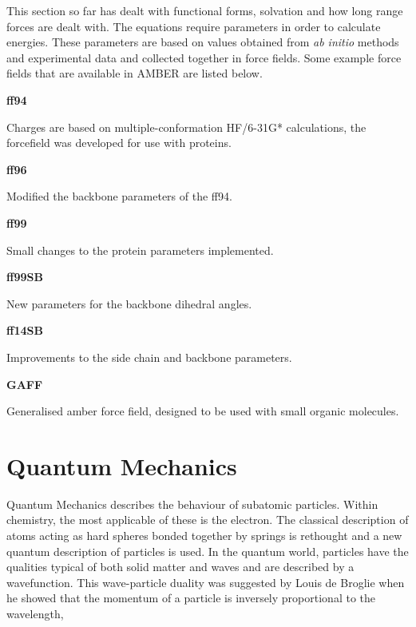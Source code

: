 This section so far has dealt with functional forms, solvation and how long range forces are dealt with.  The equations require parameters in order to calculate energies.  These parameters are based on values obtained from \textit{ab initio} methods and experimental data and collected together in force fields.  Some example force fields that are available in AMBER\cite{amber_ref} are listed below.

\noindent
\textbf{ff94}\cite{ff94}

Charges are based on multiple-conformation HF/6-31G* calculations, the forcefield was developed for use with proteins.

\noindent
\textbf{ff96}\cite{ff96}

Modified the backbone parameters of the ff94.

\noindent
\textbf{ff99}\cite{ff99}

Small changes to the protein parameters implemented.

\noindent
\textbf{ff99SB}\cite{amber_ff_review}

New parameters for the backbone dihedral angles.

\noindent
\textbf{ff14SB}\cite{amber14}

Improvements to the side chain and backbone parameters.

\noindent
\textbf{GAFF}\cite{gaff}

Generalised amber force field, designed to be used with small organic molecules.

\clearpage

\section{Quantum Mechanics}

Quantum Mechanics describes the behaviour of subatomic particles.  Within chemistry, the most applicable of these is the electron.  The classical description of atoms acting as hard spheres bonded together by springs is rethought and a new quantum description of particles is used.  In the quantum world, particles have the qualities typical of both solid matter and waves and are described by a wavefunction.  This wave-particle duality was suggested by Louis de Broglie \cite{DeBroglie_thesis} when he showed that the momentum of a particle is inversely proportional to the wavelength,

